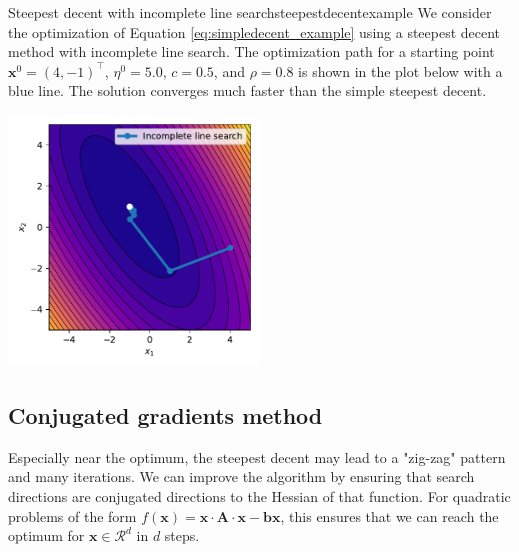 \begin{example}{Steepest decent with incomplete line search}{steepestdecentexample}
    We consider the optimization of Equation \eqref{eq:simpledecent_example} using a steepest decent method with incomplete line search. The optimization path for a starting point $\mathbf{x}^0= (4, -1)^\top$, $\eta^0=5.0$, $c=0.5$, and $\rho=0.8$ is shown in the plot below with a blue line. The solution converges much faster than the simple steepest decent.
    \begin{center}
        \includegraphics[width=0.5\textwidth]{figures/steepest_decent.pdf}
    \end{center}   
\end{example}

\subsection{Conjugated gradients method}
Especially near the optimum, the steepest decent may lead to a "zig-zag" pattern and many iterations. We can improve the algorithm by ensuring that search directions are conjugated directions to the Hessian of that function. For quadratic problems of the form $f(\mathbf{x}) = \mathbf{x} \cdot \mathbf{A} \cdot \mathbf{x} - \mathbf{b} \mathbf{x}$, this ensures that we can reach the optimum for $\mathbf{x} \in \mathcal{R}^d$ in $d$ steps.

